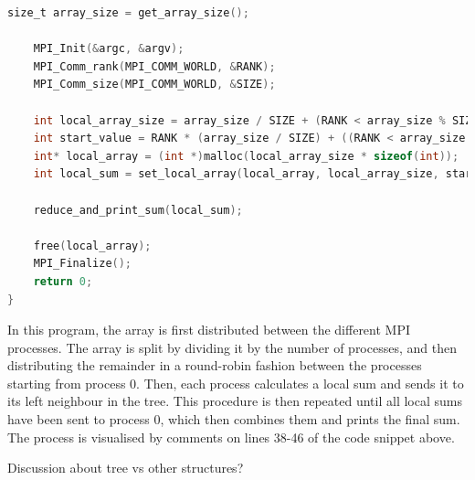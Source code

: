 \begin{lstlisting}[language=C]
    size_t array_size = get_array_size();

    MPI_Init(&argc, &argv);
    MPI_Comm_rank(MPI_COMM_WORLD, &RANK);
    MPI_Comm_size(MPI_COMM_WORLD, &SIZE);

    int local_array_size = array_size / SIZE + (RANK < array_size % SIZE);
    int start_value = RANK * (array_size / SIZE) + ((RANK < array_size % SIZE) ? RANK : array_size % SIZE);
    int* local_array = (int *)malloc(local_array_size * sizeof(int));    
    int local_sum = set_local_array(local_array, local_array_size, start_value);

    reduce_and_print_sum(local_sum);

    free(local_array);
    MPI_Finalize();
    return 0;
}
\end{lstlisting}

In this program, the array is first distributed between the different MPI processes. The array is split by dividing it by the number of processes, and then distributing the remainder in a round-robin fashion between the processes starting from process 0. Then, each process calculates a local sum and sends it to its left neighbour in the tree. This procedure is then repeated until all local sums have been sent to process 0, which then combines them and prints the final sum. The process is visualised by comments on lines 38-46 of the code snippet above.

Discussion about tree vs other structures?